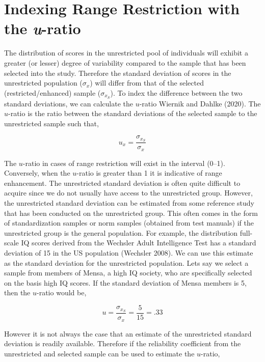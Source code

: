 \documentclass[
  letterpaper,
  DIV=11,
  numbers=noendperiod]{scrreprt}
\begin{document}
\hypertarget{indexing-range-restriction-with-the-u-ratio}{%
\section{\texorpdfstring{Indexing Range Restriction with the
\emph{u}-ratio}{Indexing Range Restriction with the u-ratio}}\label{indexing-range-restriction-with-the-u-ratio}}

The distribution of scores in the unrestricted pool of individuals will
exhibit a greater (or lesser) degree of variability compared to the
sample that has been selected into the study. Therefore the standard
deviation of scores in the unrestricted population (\(\sigma_x\)) will
differ from that of the selected (restricted/enhanced) sample
(\(\sigma_{x_{S}}\)). To index the difference between the two standard
deviations, we can calculate the \(u\)-ratio Wiernik and Dahlke (2020).
The \(u\)-ratio is the ratio between the standard deviations of the
selected sample to the unrestricted sample such that,

\[
u_x = \frac{\sigma_{x_S}}{\sigma_x}
\]

The \(u\)-ratio in cases of range restriction will exist in the interval
(0--1). Conversely, when the \(u\)-ratio is greater than 1 it is
indicative of range enhancement. The unrestricted standard deviation is
often quite difficult to acquire since we do not usually have access to
the unrestricted group. However, the unrestricted standard deviation can
be estimated from some reference study that has been conducted on the
unrestricted group. This often comes in the form of standardization
samples or norm samples (obtained from test manuals) if the unrestricted
group is the general population. For example, the distribution
full-scale IQ scores derived from the Wechsler Adult Intelligence Test
has a standard deviation of 15 in the US population (Wechsler 2008). We
can use this estimate as the standard deviation for the unrestricted
population. Lets say we select a sample from members of Mensa, a high IQ
society, who are specifically selected on the basis high IQ scores. If
the standard deviation of Mensa members is 5, then the \(u\)-ratio would
be,

\[
u =  \frac{\sigma_{x_S}}{\sigma_x} = \frac{5}{15}= .33
\]

However it is not always the case that an estimate of the unrestricted
standard deviation is readily available. Therefore if the reliability
coefficient from the unrestricted and selected sample can be used to
estimate the \(u\)-ratio,
\end{document}
